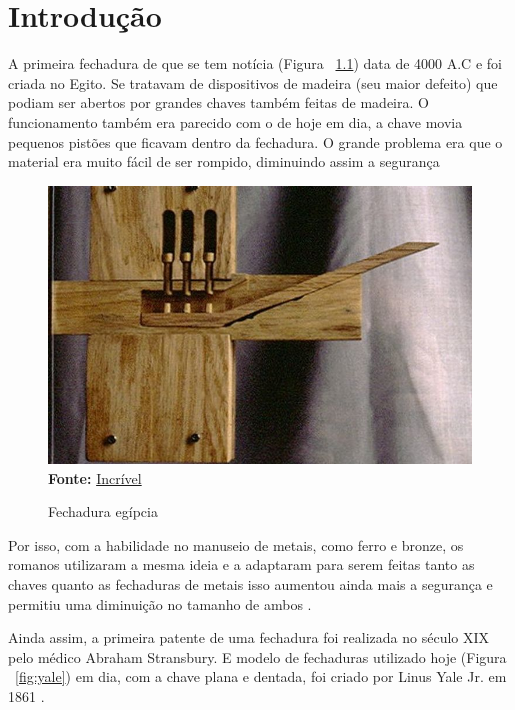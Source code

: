 \chapter{Introdução}
A primeira fechadura de que se tem notícia (Figura ~\ref{fig:egipcia})
data de 4000 A.C e foi criada no Egito. Se tratavam de dispositivos de
madeira (seu maior defeito) que podiam ser abertos por grandes chaves
também feitas de madeira. O funcionamento também era parecido com o de
hoje em dia, a chave movia pequenos pistões que ficavam dentro da fechadura.
O grande problema era que o material era muito fácil de ser rompido,
diminuindo assim a segurança \cite{cordeiro2018}

\FloatBarrier
\begin{figure}[!htbp]
	\centering
	\caption{Fechadura egípcia}
	\includegraphics[scale=.2]{imagens/egipcia}
	\\\textbf{Fonte:} \href{https://incrivel.club/admiracao-curiosidades/8-coisas-que-os-antigos-egipcios--faziam-muitos-antes--do-resto-do-mund-327860/}{Incrível}
	\label{fig:egipcia}
\end{figure}
\FloatBarrier

Por isso, com a habilidade no manuseio de metais, como ferro
e bronze, os romanos utilizaram a mesma ideia e a adaptaram para
serem feitas tanto as chaves quanto as fechaduras de metais  isso
aumentou ainda mais a segurança e permitiu uma diminuição no
tamanho de ambos \cite{reprizzo2018}.

Ainda assim, a primeira patente de uma fechadura foi realizada no século XIX
pelo médico Abraham Stransbury. E modelo de fechaduras utilizado hoje (Figura ~\ref{fig:yale})
em dia, com a chave plana e dentada, foi criado por Linus Yale Jr. em 1861 \cite{canabarro2019}.

